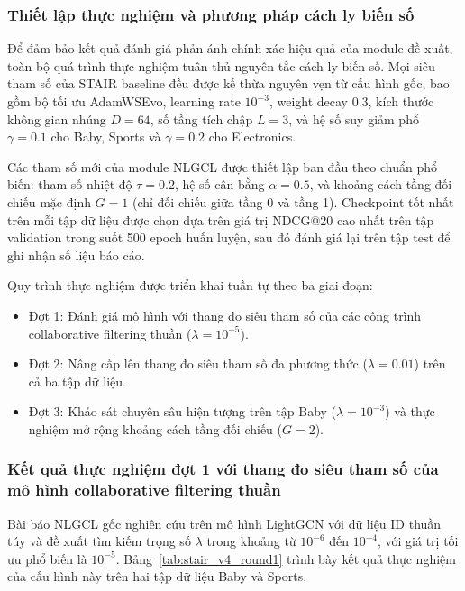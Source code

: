 \subsubsection{Thiết lập thực nghiệm và phương pháp cách ly biến số}

Để đảm bảo kết quả đánh giá phản ánh chính xác hiệu quả của module đề xuất, toàn bộ quá trình thực nghiệm tuân thủ nguyên tắc cách ly biến số. Mọi siêu tham số của STAIR baseline đều được kế thừa nguyên vẹn từ cấu hình gốc, bao gồm bộ tối ưu AdamWSEvo, learning rate $10^{-3}$, weight decay $0.3$, kích thước không gian nhúng $D=64$, số tầng tích chập $L=3$, và hệ số suy giảm phổ $\gamma = 0.1$ cho Baby, Sports và $\gamma = 0.2$ cho Electronics.

Các tham số mới của module NLGCL được thiết lập ban đầu theo chuẩn phổ biến: tham số nhiệt độ $\tau = 0.2$, hệ số cân bằng $\alpha = 0.5$, và khoảng cách tầng đối chiếu mặc định $G = 1$ (chỉ đối chiếu giữa tầng 0 và tầng 1). Checkpoint tốt nhất trên mỗi tập dữ liệu được chọn dựa trên giá trị NDCG@20 cao nhất trên tập validation trong suốt 500 epoch huấn luyện, sau đó đánh giá lại trên tập test để ghi nhận số liệu báo cáo.

Quy trình thực nghiệm được triển khai tuần tự theo ba giai đoạn:
\begin{itemize}
    \item Đợt 1: Đánh giá mô hình với thang đo siêu tham số của các công trình collaborative filtering thuần ($\lambda = 10^{-5}$).
    \item Đợt 2: Nâng cấp lên thang đo siêu tham số đa phương thức ($\lambda = 0.01$) trên cả ba tập dữ liệu.
    \item Đợt 3: Khảo sát chuyên sâu hiện tượng trên tập Baby ($\lambda = 10^{-3}$) và thực nghiệm mở rộng khoảng cách tầng đối chiếu ($G=2$).
\end{itemize}

\subsubsection{Kết quả thực nghiệm đợt 1 với thang đo siêu tham số của mô hình collaborative filtering thuần}

Bài báo NLGCL gốc nghiên cứu trên mô hình LightGCN với dữ liệu ID thuần túy và đề xuất tìm kiếm trọng số $\lambda$ trong khoảng từ $10^{-6}$ đến $10^{-4}$, với giá trị tối ưu phổ biến là $10^{-5}$. Bảng~\ref{tab:stair_v4_round1} trình bày kết quả thực nghiệm của cấu hình này trên hai tập dữ liệu Baby và Sports.

